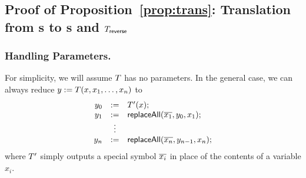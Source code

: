 \subsection{Proof of Proposition~\ref{prop:trans}: Translation from \SPPT{}s to \PT{}s and $T_{\sf reverse}$}

%





\subsubsection{Handling Parameters.}
For simplicity, we will assume $T$ has no parameters.
%
In the general case, we can always reduce
$y := T(x, x_1, \ldots, x_n)$
to
\[
    \begin{array}{rcl}
        y_0 &:=& T'(x); \\
        y_1 &:=& \mathsf{replaceAll}(\overline{x_1}, y_0, x_1); \\
            &\vdots& \\
        y_n &:=& \mathsf{replaceAll}(\overline{x_n}, y_{n-1}, x_n);
    \end{array}
\]
where $T'$ simply outputs a special symbol $\overline{x_i}$ in place of
the contents of a variable $x_i$.

